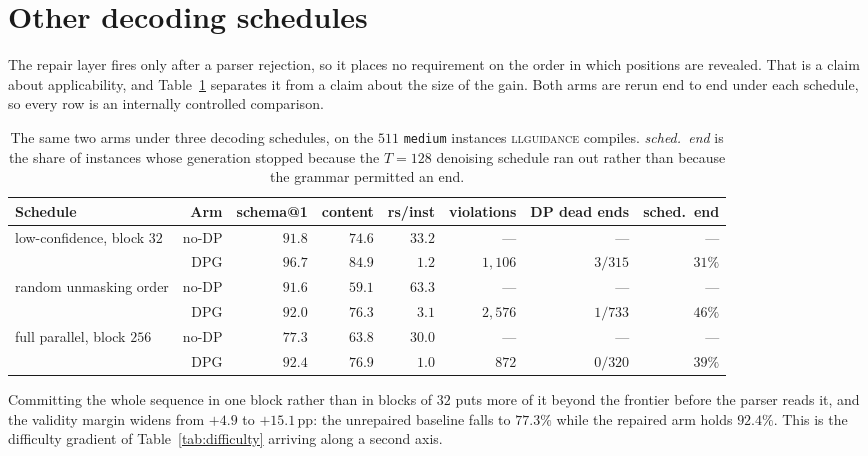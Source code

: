 \section{Other decoding schedules}
\label{app:schedules}

The repair layer fires only after a parser rejection, so it places no
requirement on the order in which positions are revealed. That is a claim about
applicability, and Table~\ref{tab:schedules} separates it from a claim about the
size of the gain. Both arms are rerun end to end under each schedule, so every
row is an internally controlled comparison.

\begin{table}[h]
\centering
\small
\setlength{\tabcolsep}{4pt}
\caption{The same two arms under three decoding schedules, on the $511$
\texttt{medium} instances \textsc{llguidance} compiles. \emph{sched.\ end} is the
share of instances whose generation stopped because the $T{=}128$ denoising
schedule ran out rather than because the grammar permitted an end.}
\label{tab:schedules}
\begin{tabular}{@{}lrrrrrrr@{}}
\toprule
Schedule & Arm & schema@1 & content & rs/inst & violations & DP dead ends & sched.\ end \\
\midrule
\multirow{2}{*}{low-confidence, block $32$}
 & no-DP & $91.8$ & $74.6$ & $33.2$ & --- & --- & --- \\
 & DPG   & $\mathbf{96.7}$ & $\mathbf{84.9}$ & $1.2$ & $1{,}106$ & $3/315$ & $31\%$ \\
\midrule
\multirow{2}{*}{random unmasking order}
 & no-DP & $91.6$ & $59.1$ & $63.3$ & --- & --- & --- \\
 & DPG   & $\mathbf{92.0}$ & $\mathbf{76.3}$ & $3.1$ & $2{,}576$ & $1/733$ & $46\%$ \\
\midrule
\multirow{2}{*}{full parallel, block $256$}
 & no-DP & $77.3$ & $63.8$ & $30.0$ & --- & --- & --- \\
 & DPG   & $\mathbf{92.4}$ & $\mathbf{76.9}$ & $1.0$ & $872$ & $0/320$ & $39\%$ \\
\bottomrule
\end{tabular}
\end{table}

Committing the whole sequence in one block rather than in blocks of $32$ puts
more of it beyond the frontier before the parser reads it, and the validity
margin widens from $+4.9$ to $+15.1$\,pp: the unrepaired baseline falls to
$77.3\%$ while the repaired arm holds $92.4\%$. This is the difficulty gradient
of Table~\ref{tab:difficulty} arriving along a second axis.

